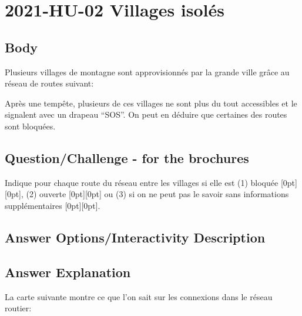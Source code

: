 \documentclass[a4paper,11pt]{report}
\newcommand{\taskGraphicsFolder}{..}
\begin{document}
\section*{\centering{} 2021-HU-02 Villages isolés}


\subsection*{Body}

Plusieurs villages de montagne sont approvisionnés par la grande ville grâce au réseau de routes suivant:

{\centering%
\par}

Après une tempête, plusieurs de ces villages ne sont plus du tout accessibles et le signalent avec un drapeau “SOS”. On peut en déduire que certaines des routes sont bloquées.

{\em


\subsection*{Question/Challenge - for the brochures}

Indique pour chaque route du réseau entre les villages si elle est (1) bloquée \raisebox{-0.5ex}[0pt][0pt]{}, (2) ouverte \raisebox{-0.5ex}[0pt][0pt]{} ou (3) si on ne peut pas le savoir sans informations supplémentaires \raisebox{-0.5ex}[0pt][0pt]{}.

}

\begingroup
\renewcommand{\arraystretch}{1.5}
\subsection*{Answer Options/Interactivity Description}



\endgroup

\subsection*{Answer Explanation}

La carte suivante montre ce que l’on sait sur les connexions dans le réseau routier:
\end{document}
